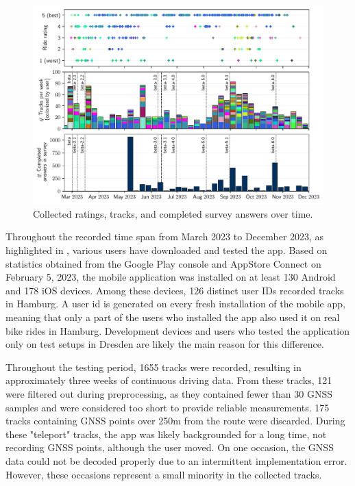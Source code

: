 \begin{figure}[!b]
\caption{Collected ratings, tracks, and completed survey answers over time.}\label{fig:app-usage-over-time}
\includegraphics[width=\linewidth]{images/app-usage-over-time.pdf}
\end{figure}

Throughout the recorded time span from March 2023 to December 2023, as highlighted in , various users have downloaded and tested the app. Based on statistics obtained from the Google Play console and AppStore Connect on February 5, 2023, the mobile application was installed on at least 130 Android and 178 iOS devices. Among these devices, 126 distinct user IDs recorded tracks in Hamburg. A user id is generated on every fresh installation of the mobile app, meaning that only a part of the users who installed the app also used it on real bike rides in Hamburg. Development devices and users who tested the application only on test setups in Dresden are likely the main reason for this difference.

Throughout the testing period, 1655 tracks were recorded, resulting in approximately three weeks of continuous driving data. From these tracks, 121 were filtered out during preprocessing, as they contained fewer than 30 GNSS samples and were considered too short to provide reliable measurements. 175 tracks containing GNSS points over 250m from the route were discarded. During these "teleport" tracks, the app was likely backgrounded for a long time, not recording GNSS points, although the user moved. On one occasion, the GNSS data could not be decoded properly due to an intermittent implementation error. However, these occasions represent a small minority in the collected tracks.

